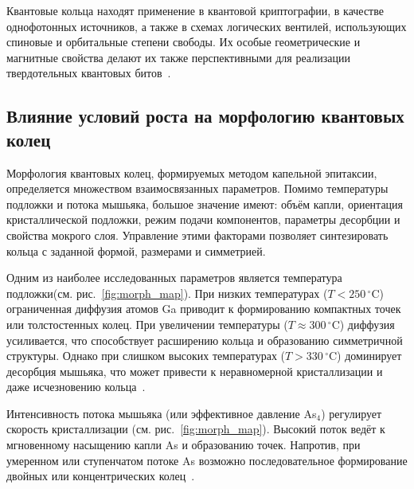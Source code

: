 \documentclass[14pt,oneside]{extarticle}
\begin{document}
Квантовые кольца находят применение в квантовой криптографии, в качестве однофотонных источников, а также в схемах логических вентилей, использующих спиновые и орбитальные степени свободы. Их особые геометрические и магнитные свойства делают их также перспективными для реализации твердотельных квантовых битов~\cite{Liu2019}.

\subsection{Влияние условий роста на морфологию квантовых колец}

Морфология квантовых колец, формируемых методом капельной эпитаксии, определяется множеством взаимосвязанных параметров. Помимо температуры подложки и потока мышьяка, большое значение имеют: объём капли, ориентация кристаллической подложки, режим подачи компонентов, параметры десорбции и свойства мокрого слоя. Управление этими факторами позволяет синтезировать кольца с заданной формой, размерами и симметрией.

Одним из наиболее исследованных параметров является температура подложки(см. рис.~\ref{fig:morph_map}). При низких температурах ($T < 250\,^{\circ}\mathrm{C}$) ограниченная диффузия атомов Ga приводит к формированию компактных точек или толстостенных колец. При увеличении температуры ($T \approx 300\,^{\circ}\mathrm{C}$) диффузия усиливается, что способствует расширению кольца и образованию симметричной структуры. Однако при слишком высоких температурах ($T > 330\,^{\circ}\mathrm{C}$) доминирует десорбция мышьяка, что может привести к неравномерной кристаллизации и даже исчезновению кольца~\cite{sibirmovskiy2014,vasilevskiy2013}.

Интенсивность потока мышьяка (или эффективное давление As$_4$) регулирует скорость кристаллизации (см. рис.~\ref{fig:morph_map}). Высокий поток ведёт к мгновенному насыщению капли As и образованию точек. Напротив, при умеренном или ступенчатом потоке As возможно последовательное формирование двойных или концентрических колец~\cite{zhou2013,fan2023}.
\end{document}
